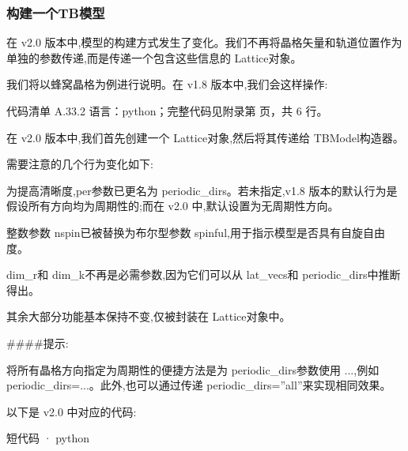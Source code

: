 \documentclass[lang=cn,scheme=chinese,color=blue,device=normal,toc=onecol,math=cm]{elegantbook}
\begin{document}
\subsubsection{构建一个TB模型}


在 v2.0 版本中,模型的构建方式发生了变化。我们不再将晶格矢量和轨道位置作为单独的参数传递,而是传递一个包含这些信息的 Lattice对象。\par


我们将以蜂窝晶格为例进行说明。在 v1.8 版本中,我们会这样操作:\par


\begin{codeindexbox}{代码清单 A.33.2}
语言：python；完整代码见附录第 \pageref{code:33:2} 页，共 6 行。
\end{codeindexbox}


在 v2.0 版本中,我们首先创建一个 Lattice对象,然后将其传递给 TBModel构造器。\par


需要注意的几个行为变化如下:\par


为提高清晰度,per参数已更名为 periodic\_\allowbreak{}dirs。若未指定,v1.8 版本的默认行为是假设所有方向均为周期性的;而在 v2.0 中,默认设置为无周期性方向。\par


整数参数 nspin已被替换为布尔型参数 spinful,用于指示模型是否具有自旋自由度。\par


dim\_\allowbreak{}r和 dim\_\allowbreak{}k不再是必需参数,因为它们可以从 lat\_\allowbreak{}vecs和 periodic\_\allowbreak{}dirs中推断得出。\par


其余大部分功能基本保持不变,仅被封装在 Lattice对象中。\par


\#\#\#\#提示:\par


将所有晶格方向指定为周期性的便捷方法是为 periodic\_\allowbreak{}dirs参数使用 ...,例如 periodic\_\allowbreak{}dirs=...。此外,也可以通过传递 periodic\_\allowbreak{}dirs=”all”来实现相同效果。\par


以下是 v2.0 中对应的代码:\par


\begin{inlinecodebox}{短代码 · python}
\end{inlinecodebox}
\end{document}
